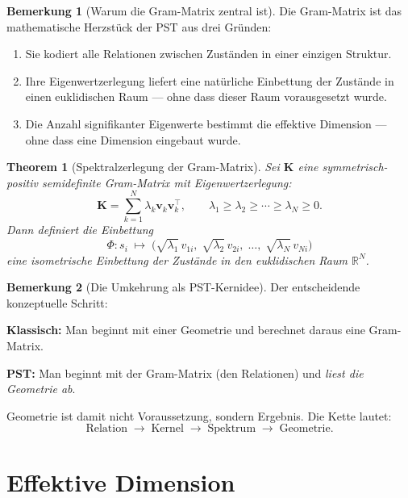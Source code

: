 \documentclass[11pt,a4paper]{article}
\theoremstyle{plain}
\newtheorem{theorem}{Theorem}[section]
\theoremstyle{definition}
\newtheorem{remark}{Bemerkung}[section]
\newcommand{\Kmat}{\mathbf{K}}
\begin{document}
\begin{remark}[Warum die Gram-Matrix zentral ist]
Die Gram-Matrix ist das mathematische Herzst\"{u}ck der PST aus drei
Gr\"{u}nden:
\begin{enumerate}
  \item Sie kodiert alle Relationen zwischen Zust\"{a}nden in einer
        einzigen Struktur.
  \item Ihre Eigenwertzerlegung liefert eine nat\"{u}rliche Einbettung
        der Zust\"{a}nde in einen euklidischen Raum --- ohne dass dieser
        Raum vorausgesetzt wurde.
  \item Die Anzahl signifikanter Eigenwerte bestimmt die effektive
        Dimension --- ohne dass eine Dimension eingebaut wurde.
\end{enumerate}
\end{remark}

\begin{theorem}[Spektralzerlegung der Gram-Matrix]
Sei $\Kmat$ eine symmetrisch-positiv semidefinite Gram-Matrix mit
Eigenwertzerlegung:
\[
  \Kmat = \sum_{k=1}^{N} \lambda_k \mathbf{v}_k \mathbf{v}_k^\top,
  \qquad \lambda_1 \geq \lambda_2 \geq \cdots \geq \lambda_N \geq 0.
\]
Dann definiert die Einbettung
\[
  \Phi\colon s_i \;\mapsto\;
  \bigl(\sqrt{\lambda_1}\, v_{1i},\; \sqrt{\lambda_2}\, v_{2i},\;
  \ldots,\; \sqrt{\lambda_N}\, v_{Ni}\bigr)
\]
eine isometrische Einbettung der Zust\"{a}nde in den euklidischen Raum
$\mathbb{R}^N$.
\end{theorem}

\begin{remark}[Die Umkehrung als PST-Kernidee]
Der entscheidende konzeptuelle Schritt:

\medskip
\textbf{Klassisch:} Man beginnt mit einer Geometrie und berechnet daraus
eine Gram-Matrix.

\medskip
\textbf{PST:} Man beginnt mit der Gram-Matrix (den Relationen) und
\emph{liest die Geometrie ab}.

\medskip
Geometrie ist damit nicht Voraussetzung, sondern Ergebnis. Die Kette lautet:
\[
  \text{Relation} \;\rightarrow\; \text{Kernel} \;\rightarrow\;
  \text{Spektrum} \;\rightarrow\; \text{Geometrie.}
\]
\end{remark}

\section{Effektive Dimension}
\end{document}
